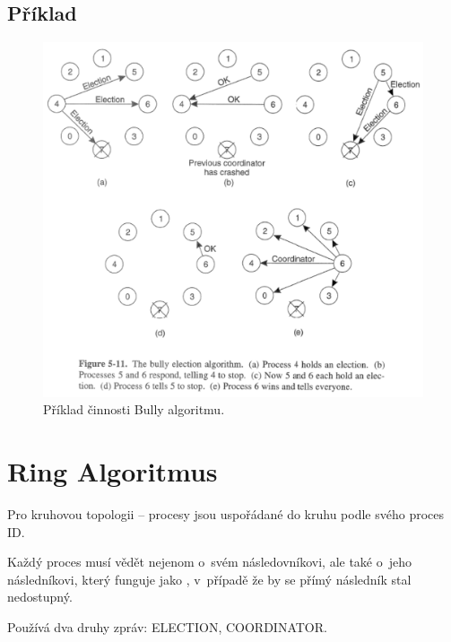 \subsection{Příklad}

\begin{figure}[H]
    \centering
    \includegraphics[width=1\linewidth]{example_bully.pdf}
    \caption{Příklad činnosti Bully algoritmu.}
\end{figure}


\section{Ring Algoritmus}

\begin{compactitem}
    \item Pro kruhovou topologii -- procesy jsou uspořádané do kruhu podle svého proces ID.

    \item Každý proces musí vědět nejenom o~svém následovníkovi, ale také o~jeho následníkovi, který funguje jako , v~případě že by se přímý následník stal nedostupný.

    \item Používá dva druhy zpráv: ELECTION, COORDINATOR.
\end{compactitem}

